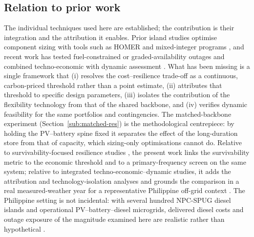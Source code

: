 \documentclass[preprint,12pt]{elsarticle}
\begin{document}
\subsection{Relation to prior work}
The individual techniques used here are established; the contribution is their
integration and the attribution it enables. Prior island studies optimise component
sizing with tools such as HOMER and mixed-integer programs
\cite{pascasio_2021_philippines_pv_wind,castro_2024_208_islands_transition}, and
recent work has tested fuel-constrained or graded-availability outages
\cite{marqusee2021resilience,sharifpour_2023_hydrogen_extreme_events} and combined
techno-economic with dynamic assessment
\cite{huang_2023_economic_resilient_h2_microgrid,shahbazbegian_2023_resilience_p2h}.
What has been missing is a single framework that (i) resolves the cost--resilience
trade-off as a continuous, carbon-priced threshold rather than a point estimate,
(ii) attributes that threshold to specific design parameters, (iii) isolates the
contribution of the flexibility technology from that of the shared backbone, and
(iv) verifies dynamic feasibility for the same portfolios and contingencies. The
matched-backbone experiment (Section~\ref{sub:matched-res}) is the methodological
centrepiece: by holding the PV--battery spine fixed it separates the effect of the
long-duration store from that of capacity, which sizing-only optimisations cannot do.
Relative to survivability-focused resilience studies
\cite{marqusee2021resilience,gao_2016_critical_load_restoration,mishra2023microgrid},
the present work links the survivability metric to the economic threshold and to a
primary-frequency screen on the same system; relative to integrated
techno-economic--dynamic studies, it adds the attribution and technology-isolation
analyses and grounds the comparison in a real measured-weather year for a
representative Philippine off-grid context
\cite{castro_2022_634_islands_hres,meschede2019transferability}. The Philippine
setting is not incidental: with several hundred NPC-SPUG diesel islands and
operational PV--battery--diesel microgrids, delivered diesel costs and outage
exposure of the magnitude examined here are realistic rather than hypothetical
\cite{ocon_bertheau_2019_philippines_diesel_pvbatt,bertheau2018resilient}.
\end{document}
